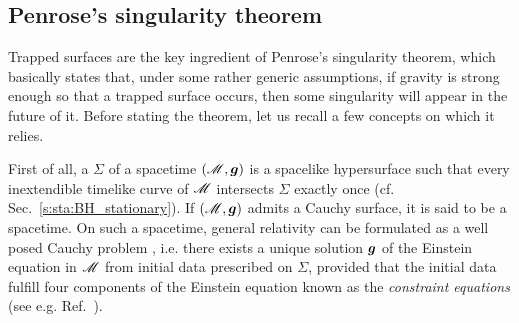 \subsection{Penrose's singularity theorem}

Trapped surfaces are the key ingredient of Penrose's singularity theorem,
which basically states that, under some rather generic assumptions, if gravity is
strong enough so that a trapped surface occurs, then some singularity will
appear in the future of it.
Before stating the theorem, let us recall a few concepts on which it relies.

First of all, a 
$\Sigma$ of a spacetime $(\mathscr{M},\bm{g})$ is a spacelike
hypersurface such that every inextendible timelike curve of $\mathscr{M}$
intersects $\Sigma$ exactly once (cf. Sec.~\ref{s:sta:BH_stationary}). If $(\mathscr{M},\bm{g})$
admits a Cauchy surface, it is said to be a
 spacetime.
On such a spacetime, general relativity can be formulated as a well posed
Cauchy problem \cite{ChoquG69},
i.e. there exists a unique solution $\bm{g}$ of the Einstein equation
in $\mathscr{M}$ from initial data prescribed on $\Sigma$, provided that the initial data
fulfill four components of the Einstein equation known as the
\emph{constraint equations}
(see e.g. Ref.~\cite{Gourg12}).

